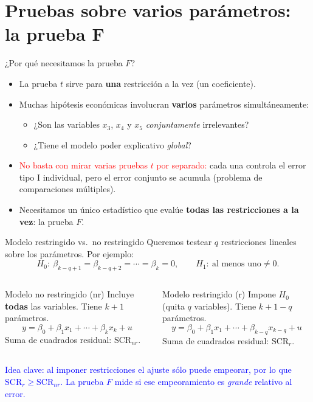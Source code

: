 \documentclass{beamer}
\begin{document}
\section{Pruebas sobre varios parámetros: la prueba F}

\begin{frame}{¿Por qué necesitamos la prueba $F$?}
\begin{itemize}
    \item La prueba $t$ sirve para \textbf{una} restricción a la vez (un coeficiente).
    \item Muchas hipótesis económicas involucran \textbf{varios} parámetros simultáneamente:
    \begin{itemize}
        \item ¿Son las variables $x_3$, $x_4$ y $x_5$ \emph{conjuntamente} irrelevantes?
        \item ¿Tiene el modelo poder explicativo \emph{global}?
    \end{itemize}
    \pause
    \item \textcolor{red}{No basta con mirar varias pruebas $t$ por separado:} cada una controla el error tipo I individual, pero el error conjunto se acumula (problema de comparaciones múltiples).
    \item Necesitamos un único estadístico que evalúe \textbf{todas las restricciones a la vez}: la prueba $F$.
\end{itemize}
\end{frame}

\begin{frame}{Modelo restringido vs.\ no restringido}
Queremos testear $q$ restricciones lineales sobre los parámetros. Por ejemplo:
\[
H_0:\ \beta_{k-q+1} = \beta_{k-q+2} = \cdots = \beta_{k} = 0,
\qquad
H_1:\ \text{al menos uno}\neq 0 .
\]
\begin{columns}
  \begin{block}{Modelo no restringido (nr)}
  Incluye \textbf{todas} las variables. Tiene $k+1$ parámetros.
  \[
  y = \beta_0 + \beta_1 x_1 + \cdots + \beta_k x_k + u
  \]
  Suma de cuadrados residual: $\text{SCR}_{nr}$.
  \end{block}

  \begin{alertblock}{Modelo restringido (r)}
  Impone $H_0$ (quita $q$ variables). Tiene $k+1-q$ parámetros.
  \[
  y = \beta_0 + \beta_1 x_1 + \cdots + \beta_{k-q} x_{k-q} + u
  \]
  Suma de cuadrados residual: $\text{SCR}_{r}$.
  \end{alertblock}
\end{columns}
\vspace{2mm}
\textcolor{blue}{Idea clave: al imponer restricciones el ajuste sólo puede empeorar, por lo que $\text{SCR}_r \geq \text{SCR}_{nr}$. La prueba $F$ mide si ese empeoramiento es \emph{grande} relativo al error.}
\end{frame}
\end{document}
